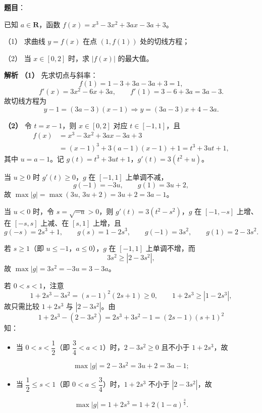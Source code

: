 \begin{answer}

\textbf{题目}：

已知 $a\in\mathbf R$，函数 $f(x)=x^3-3x^2+3ax-3a+3$。

（1） 求曲线 $y=f(x)$ 在点 $(1,f(1))$ 处的切线方程；

（2） 当 $x\in[0,2]$ 时，求 $|f(x)|$ 的最大值。

\textbf{解析}
\textbf{（1）} 先求切点与斜率：
\nopagebreak[4]
\[f(1)=1-3+3a-3a+3=1,\]
\nopagebreak[4]
\[f'(x)=3x^2-6x+3a,\qquad f'(1)=3-6+3a=3a-3.\]
故切线方程为
\nopagebreak[4]
\[y-1=(3a-3)(x-1)\Longrightarrow y=(3a-3)x+4-3a.\]

\textbf{（2）} 令 $t=x-1$，则 $x\in[0,2]$ 对应 $t\in[-1,1]$，且
\nopagebreak[4]
\[\begin{aligned}
f(x)&=x^3-3x^2+3ax-3a+3\\
&=(x-1)^3+3(a-1)(x-1)+1=t^3+3ut+1,
\end{aligned}\]
其中 $u=a-1$。记 $g(t)=t^3+3ut+1$，$g'(t)=3(t^2+u)$。

当 $u\geqslant0$ 时 $g'(t)\geqslant0$，$g$ 在 $[-1,1]$ 上单调不减，
\nopagebreak[4]
\[g(-1)=-3u,\qquad g(1)=3u+2,\]
故 $\max|g|=\max(3u,\,3u+2)=3u+2=3a-1$。

当 $u<0$ 时，令 $s=\sqrt{-u}>0$，则 $g'(t)=3(t^2-s^2)$，$g$ 在 $[-1,-s]$ 上增、在 $[-s,s]$ 上减、在 $[s,1]$ 上增，且
\nopagebreak[4]
\[g(-s)=2s^3+1,\qquad g(s)=1-2s^3,\qquad g(-1)=3s^2,\qquad g(1)=2-3s^2.\]

若 $s\geqslant1$（即 $u\leqslant-1$，$a\leqslant0$），$g$ 在 $[-1,1]$ 上单调不增，而
\nopagebreak[4]
\[3s^2\geqslant|2-3s^2|,\]
故 $\max|g|=3s^2=-3u=3-3a$。

若 $0<s<1$，注意
\nopagebreak[4]
\[1+2s^3-3s^2=(s-1)^2(2s+1)\geqslant0,\qquad 1+2s^3\geqslant|1-2s^3|,\]
故只需比较 $1+2s^3$ 与 $|2-3s^2|$。由
\nopagebreak[4]
\[1+2s^3-(2-3s^2)=2s^3+3s^2-1=(2s-1)(s+1)^2\]
知：
\begin{itemize}
\item 当 $0<s<\dfrac12$（即 $\dfrac34<a<1$）时，$2-3s^2\geqslant0$ 且不小于 $1+2s^3$，故
\end{itemize}
\nopagebreak[4]
\[\max|g|=2-3s^2=3u+2=3a-1;\]
\begin{itemize}
\item 当 $\dfrac12\leqslant s<1$（即 $0<a\leqslant\dfrac34$）时，$1+2s^3$ 不小于 $|2-3s^2|$，故
\end{itemize}
\nopagebreak[4]
\[\max|g|=1+2s^3=1+2(1-a)^{\frac32}.\]


\end{answer}
